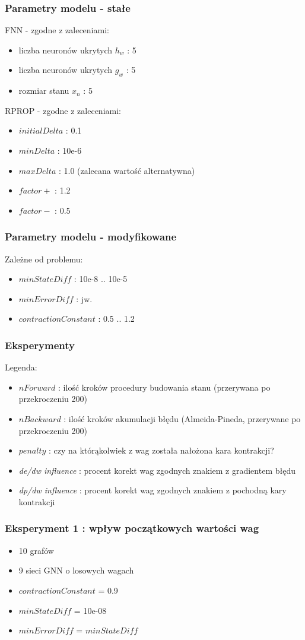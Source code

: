 \documentclass{beamer}
\begin{document}
\begin{frame}
\frametitle{Parametry modelu - stałe}
FNN - zgodne z zaleceniami:
\begin{itemize}
	\item liczba neuronów ukrytych $h_w$ : 5
	\item liczba neuronów ukrytych $g_w$ : 5
	\item rozmiar stanu $x_n$ : 5
\end{itemize}
RPROP - zgodne z zaleceniami:
\begin{itemize}
	\item $initialDelta$ : 0.1
	\item $minDelta$ : 10e-6
	\item $maxDelta$ : 1.0 (zalecana wartość alternatywna)
	\item $factor+$ : 1.2
	\item $factor-$ : 0.5
\end{itemize}
\end{frame}

\begin{frame}
\frametitle{Parametry modelu - modyfikowane}
Zależne od problemu:
\begin{itemize}
	\item $minStateDiff$ : 10e-8 .. 10e-5
	\item $minErrorDiff$ : jw.
	\item $contractionConstant$ : 0.5 .. 1.2
\end{itemize}
\end{frame}

\begin{frame}
\frametitle{Eksperymenty}
Legenda:
\begin{itemize}
	\item $nForward$ : ilość kroków procedury budowania stanu (przerywana po przekroczeniu 200)
	\item $nBackward$ : ilość kroków akumulacji błędu (Almeida-Pineda, przerywane po przekroczeniu 200)
	\item $penalty$ : czy na którąkolwiek z wag została nałożona kara kontrakcji?
	\item \emph{de/dw influence} : procent korekt wag zgodnych znakiem z gradientem błędu
	\item \emph{dp/dw influence} : procent korekt wag zgodnych znakiem z pochodną kary kontrakcji
\end{itemize}
\end{frame}

\begin{frame}
\frametitle{Eksperyment 1 : wpływ początkowych wartości wag}
\begin{itemize}
	\item 10 grafów
	\item 9 sieci GNN o losowych wagach
	\item $contractionConstant$ = 0.9
	\item $minStateDiff$ = 10e-08
	\item $minErrorDiff$ = $minStateDiff$
\end{itemize}
\end{frame}
\end{document}
